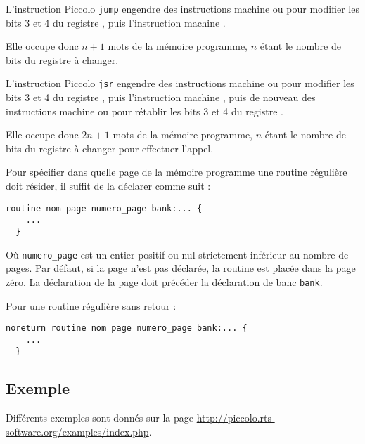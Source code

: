 
L'instruction Piccolo \texttt{jump} engendre des instructions machine  ou  pour modifier les bits 3 et 4 du registre , puis l'instruction machine .

Elle occupe donc $n+1$ mots de la mémoire programme, $n$ étant le nombre de bits du registre  à changer.





L'instruction Piccolo  \texttt{jsr} engendre des instructions machine  ou  pour modifier les bits 3 et 4 du registre , puis l'instruction machine , puis de nouveau des instructions machine  ou  pour rétablir les bits 3 et 4 du registre .

Elle occupe donc $2n+1$ mots de la mémoire programme, $n$ étant le nombre de bits du registre  à changer pour effectuer l'appel.


Pour spécifier dans quelle page de la mémoire programme une routine régulière doit résider, il suffit de la déclarer comme suit :
\begin{lstlisting}[language=piccolo]
  routine nom page numero_page bank:... {
    ...
  }
\end{lstlisting}

Où \texttt{numero\_page} est un entier positif ou nul strictement inférieur au nombre de pages. Par défaut, si la page n'est pas déclarée, la routine est placée dans la page zéro. La déclaration de la page doit précéder la déclaration de banc \texttt{bank}.

Pour une routine régulière sans retour :
\begin{lstlisting}[language=piccolo]
  noreturn routine nom page numero_page bank:... {
    ...
  }
\end{lstlisting}

\subsection{Exemple}

Différents exemples sont donnés sur la page \url{http://piccolo.rts-software.org/examples/index.php}.

